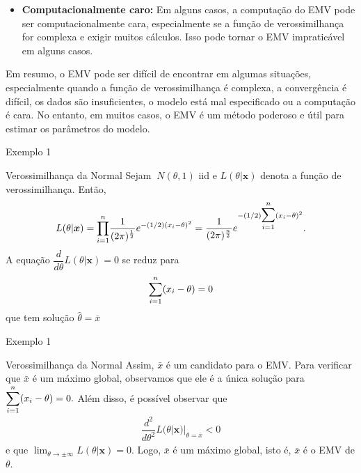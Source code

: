 \documentclass[12pt]{beamer}
\begin{document}
\begin{frame}{}
\begin{block}{}

\begin{itemize}
\justifying
\item \textbf{Computacionalmente caro:} Em alguns casos, a computação do EMV pode ser computacionalmente cara, especialmente se a função de verossimilhança for complexa e exigir muitos cálculos. Isso pode tornar o EMV impraticável em alguns casos.
\end{itemize}
\end{block}
\pause
\begin{block}{}
\justifying
Em resumo, o EMV pode ser difícil de encontrar em algumas situações, especialmente quando a função de verossimilhança é complexa, a convergência é difícil, os dados são insuficientes, o modelo está mal especificado ou a computação é cara. No entanto, em muitos casos, o EMV é um método poderoso e útil para estimar os parâmetros do modelo.
\end{block}
\end{frame}

\begin{frame}{Exemplo 1}
\begin{block}{Verossimilhança da Normal}
\justifying
Sejam \seqX $~N(\theta,1)$ iid e $L(\theta|\boldsymbol{x})$ denota a função de verossimilhança. Então,
\begin{align*}
    L(\theta|\boldsymbol{x})={\displaystyle \prod_{i=1}^{n}} \dfrac{1}{(2\pi)^{\frac{1}{2}}}e^{-(1/2)(x_{i}-\theta)^{2}}=\dfrac{1}{(2\pi)^{\frac{n}{2}}}e^{-(1/2){\displaystyle \sum_{i=1}^{n}}(x_{i}-\theta)^{2}}.
\end{align*}
A equação $\dfrac{d}{d\theta}L(\theta|\boldsymbol{x})=0$ se reduz para 
\begin{align*}
    {\displaystyle \sum_{i=1}^{n}}(x_{i}-\theta)=0
\end{align*}
que tem solução $\hat{\theta}=\bar{x}$
\end{block}
\end{frame}

\begin{frame}{Exemplo 1}
\begin{block}{Verossimilhança da Normal}
\justifying
Assim, $\bar{x}$ é um candidato para o EMV. Para verificar que $\bar{x}$ é um máximo global, observamos que ele é a única solução para ${\displaystyle \sum_{i=1}^{n}}(x_{i}-\theta)=0.$ Além disso, é possível observar que 
\begin{align*}
    \dfrac{d^{2}}{d\theta^{2}}L(\theta|\boldsymbol{x})|_{\theta=\bar{x}}<0
\end{align*}
e que ${\displaystyle \lim_{\theta\to\pm\infty}}L(\theta|\boldsymbol{x})=0.$ Logo, $\bar{x}$ é um máximo global, isto é, $\bar{x}$ é o EMV de $\theta$.
\end{block}
\end{frame}
\end{document}
